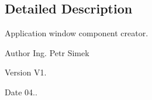 \subsection{Detailed Description}
Application window component creator. 

\begin{DoxyAuthor}{Author}
Ing. Petr Simek 
\end{DoxyAuthor}
\begin{DoxyVersion}{Version}
V1. 
\end{DoxyVersion}
\begin{DoxyDate}{Date}
04.. 
\end{DoxyDate}
